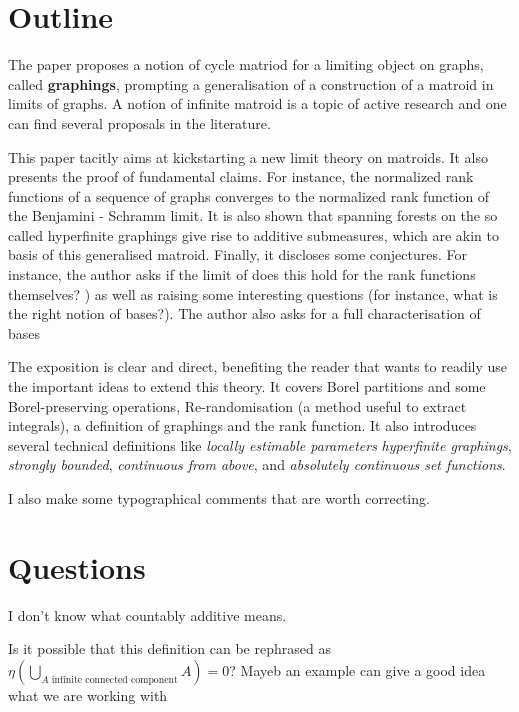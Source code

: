 \documentclass[12pt]{article}
\begin{document}
\maketitle




\section*{Outline}

The paper proposes a notion of cycle matriod for a  limiting object on graphs, called \textbf{graphings}, prompting a generalisation of a construction of a matroid in limits of graphs.
A notion of infinite matroid is a topic of active research and one can find several proposals in the literature.

This paper tacitly aims at kickstarting a new limit theory on matroids.
It also presents the proof of fundamental claims.
For instance, the  normalized rank functions of a sequence of graphs converges to the normalized rank function of the Benjamini - Schramm limit.
It is also shown that spanning forests on the so called hyperfinite graphings give rise to additive submeasures, which are akin to basis of this generalised matroid.
Finally, it discloses some conjectures.
For instance, the author asks if the limit of does this hold for the rank functions themselves? ) as well as raising some interesting questions (for instance, what is the right notion of bases?).
The author also asks for a full characterisation of bases

The exposition is clear and direct, benefiting the reader that wants to readily use the important ideas to extend this theory.
It covers Borel partitions and some Borel-preserving operations, Re-randomisation (a method useful to extract integrals), a definition of graphings and the rank function.
It also introduces several technical definitions like \textit{locally estimable parameters} \textit{hyperfinite graphings}, \textit{strongly bounded}, \textit{continuous from above}, and \textit{absolutely continuous set functions}.

I also make some typographical comments that are worth correcting.

\section*{Questions}

\begin{itemize}
I don't know what countably additive means.

Is it possible that this definition can be rephrased as $\eta(\bigcup_{A \text{ infinite connected component}} A) = 0$? Mayeb an example can give a good idea what we are working with


\end{itemize}
\end{document}
